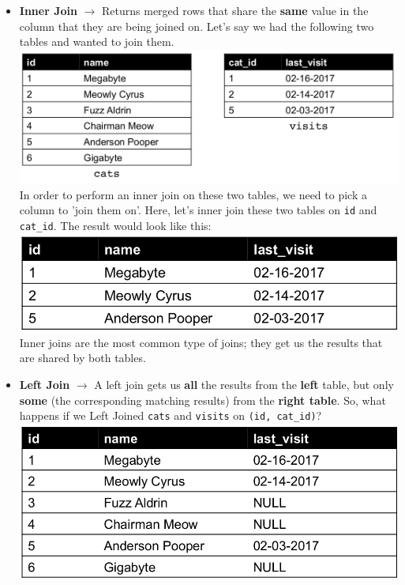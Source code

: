 \documentclass[english, 10pt]{article}
\begin{document}
\begin{itemize}
	\item \textbf{Inner Join} $\rightarrow$ Returns merged rows that share the \textbf{same} value in the column that they are being joined on. Let's say we had the following two tables and wanted to join them.\\
	
	\includegraphics[scale=0.35]{img/table_3.png}\\
	
	In order to perform an inner join on these two tables, we need to pick a column to 'join them on'. Here, let's inner join these two tables on \texttt{id} and \texttt{cat\_id}. The result would look like this:\\
	
	\includegraphics[scale=0.35]{img/table_4.png}\\
	
	Inner joins are the most common type of joins; they get us the results that are shared by both tables.
	
	\item \textbf{Left Join} $\rightarrow$ A left join gets us \textbf{all} the results from the \textbf{left} table, but only \textbf{some} (the corresponding matching results) from the \textbf{right table}. So, what happens if we Left Joined \texttt{cats} and \texttt{visits} on \texttt{(id, cat\_id)}?\\
	
	\includegraphics[scale=0.35]{img/table_5.png}\\
	

\end{itemize}
\end{document}
